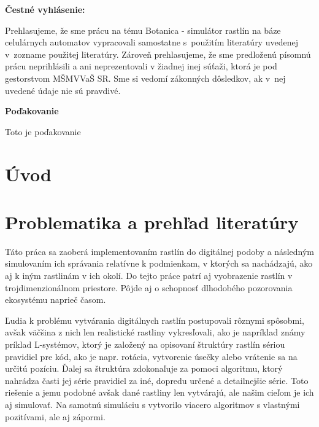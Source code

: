 \documentclass[12pt]{article}
\def\nazovprace{Botanica - simulátor rastlín na báze celulárnych automatov}
\begin{document}
\setcounter{page}{3}

%
%

\thispagestyle{empty}

\noindent
\textbf{Čestné vyhlásenie:}

\noindent
Prehlasujeme, že sme prácu na tému
\nazovprace \space
vypracovali samostatne s~použitím literatúry uvedenej v~zozname použitej literatúry.
Zároveň prehlasujeme, že sme predloženú písomnú prácu neprihlásili a ani neprezentovali
v žiadnej inej súťaži, ktorá je pod gestorstvom MŠMVVaŠ SR. Sme si vedomí zákonných dôsledkov,
ak v~nej uvedené údaje nie sú pravdivé.

\newpage


%
%

\thispagestyle{empty}

\null
\vfill

\noindent
\textbf{Poďakovanie}

\noindent
Toto je poďakovanie

\vspace{8cm}
\newpage


%
%

\thispagestyle{empty}
\tableofcontents
\newpage


%
%

\section*{Úvod}

\newpage

\section{Problematika a prehľad literatúry}

Táto práca sa zaoberá implementovaním rastlín do digitálnej podoby a následným
simulovaním ich správania relatívne k podmienkam, v ktorých sa nachádzajú,
ako aj k iným rastlinám v ich okolí. Do tejto práce patrí aj vyobrazenie
rastlín v trojdimenzionálnom priestore. Pôjde aj o schopnosť dlhodobého
pozorovania ekosystému naprieč časom.

Ľudia k problému vytvárania digitálnych rastlín postupovali rôznymi spôsobmi,
avšak väčšina z nich len realistické rastliny vykresľovali, ako je napríklad
známy príklad L-systémov, ktorý je založený na opisovaní štruktúry rastlín
sériou pravidiel pre kód, ako je napr. rotácia, vytvorenie úsečky alebo
vrátenie sa na určitú pozíciu. Ďalej sa štruktúra zdokonaľuje za pomoci
algoritmu, ktorý nahrádza časti jej série pravidiel za iné, dopredu určené
a detailnejšie série. Toto riešenie a jemu podobné avšak dané rastliny len
vytvárajú, ale našim cieľom je ich aj simulovať. Na samotnú simuláciu
s vytvorilo viacero algoritmov s vlastnými pozitívami, ale aj zápormi.
\end{document}
